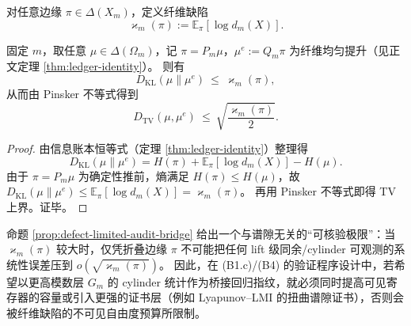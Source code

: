 \begin{definition}[纤维缺陷标量]\label{def:fiber-defect-varkappa}
对任意边缘 $\pi\in\Delta(X_m)$，定义纤维缺陷
$$
\varkappa_m(\pi):=\mathbb{E}_{\pi}[\log d_m(X)].
$$
\end{definition}

\begin{proposition}\label{prop:defect-limited-audit-bridge}
固定 $m$，取任意 $\mu\in\Delta(\Omega_m)$，记 $\pi=P_m\mu$，$\mu^e:=Q_m\pi$ 为纤维均匀提升（见正文定理 \ref{thm:ledger-identity}）。
则有
$$
D_{\mathrm{KL}}(\mu\|\mu^e)\ \le\ \varkappa_m(\pi),
$$
从而由 Pinsker 不等式得到
$$
D_{\mathrm{TV}}(\mu,\mu^e)\ \le\ \sqrt{\frac{\varkappa_m(\pi)}{2}}.
$$
\end{proposition}
\begin{proof}
由信息账本恒等式（定理 \ref{thm:ledger-identity}）整理得
$$
D_{\mathrm{KL}}(\mu\|\mu^e)=H(\pi)+\mathbb{E}_{\pi}[\log d_m(X)]-H(\mu).
$$
由于 $\pi=P_m\mu$ 为确定性推前，熵满足 $H(\pi)\le H(\mu)$，故
$
D_{\mathrm{KL}}(\mu\|\mu^e)\le \mathbb{E}_{\pi}[\log d_m(X)]=\varkappa_m(\pi)
$。
再用 Pinsker 不等式即得 TV 上界。证毕。
\end{proof}

\begin{remark}\label{rem:defect-meaning}
命题 \ref{prop:defect-limited-audit-bridge} 给出一个与谱隙无关的“可核验极限”：当 $\varkappa_m(\pi)$ 较大时，仅凭折叠边缘 $\pi$ 不可能把任何 lift 级同余/cylinder 可观测的系统性误差压到 $o(\sqrt{\varkappa_m(\pi)})$。
因此，在 (B1.c)/(B4) 的验证程序设计中，若希望以更高模数层 $G_m$ 的 cylinder 统计作为桥接回归指纹，就必须同时提高可见寄存器的容量或引入更强的证书层（例如 Lyapunov--LMI 的扭曲谱隙证书），否则会被纤维缺陷的不可见自由度预算所限制。
\end{remark}

